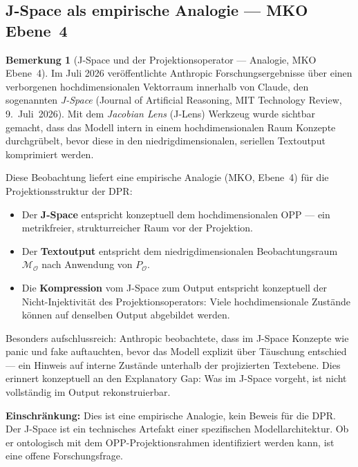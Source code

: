 \documentclass[11pt,a4paper]{article}
\theoremstyle{plain}
\theoremstyle{definition}
\newtheorem{remark}{Bemerkung}[section]
\begin{document}
\subsection{J-Space als empirische Analogie --- MKO Ebene~4}

\begin{remark}[J-Space und der Projektionsoperator --- Analogie, MKO Ebene~4]
Im Juli 2026 ver\"{o}ffentlichte Anthropic Forschungsergebnisse \"{u}ber einen verborgenen
hochdimensionalen Vektorraum innerhalb von Claude, den sogenannten \emph{J-Space}
(Journal of Artificial Reasoning, MIT Technology Review, 9.~Juli~2026). Mit dem
\emph{Jacobian Lens} (J-Lens) Werkzeug wurde sichtbar gemacht, dass das Modell intern
in einem hochdimensionalen Raum Konzepte \glqq{}durchgr\"{u}belt\grqq{}, bevor diese
in den niedrigdimensionalen, seriellen Textoutput komprimiert werden.

Diese Beobachtung liefert eine empirische Analogie (MKO, Ebene~4) f\"{u}r die
Projektionsstruktur der DPR:

\begin{itemize}
  \item Der \textbf{J-Space} entspricht konzeptuell dem hochdimensionalen OPP ---
        ein metrikfreier, strukturreicher Raum vor der Projektion.
  \item Der \textbf{Textoutput} entspricht dem niedrigdimensionalen
        Beobachtungsraum $\mathcal{M}_{\mathcal{O}}$ nach Anwendung von
        $P_{\mathcal{O}}$.
  \item Die \textbf{Kompression} vom J-Space zum Output entspricht konzeptuell
        der Nicht-Injektivit\"{a}t des Projektionsoperators: Viele hochdimensionale
        Zust\"{a}nde k\"{o}nnen auf denselben Output abgebildet werden.
\end{itemize}

Besonders aufschlussreich: Anthropic beobachtete, dass im J-Space Konzepte wie
\glqq{}panic\grqq{} und \glqq{}fake\grqq{} auftauchten, bevor das Modell explizit
\"{u}ber T\"{a}uschung entschied --- ein Hinweis auf interne Zust\"{a}nde unterhalb
der projizierten Textebene. Dies erinnert konzeptuell an den Explanatory Gap: Was
im J-Space vorgeht, ist nicht vollst\"{a}ndig im Output rekonstruierbar.

\textbf{Einschr\"{a}nkung:} Dies ist eine empirische Analogie, kein Beweis f\"{u}r die
DPR. Der J-Space ist ein technisches Artefakt einer spezifischen Modellarchitektur.
Ob er ontologisch mit dem OPP-Projektionsrahmen identifiziert werden kann, ist eine
offene Forschungsfrage.
\end{remark}
\end{document}
